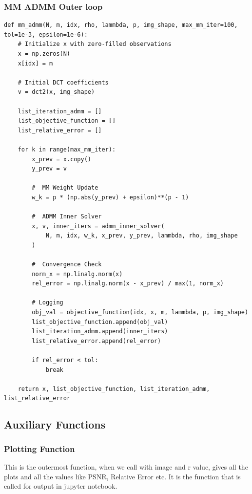 \documentclass[12pt,a4paper,onecolumn]{exam}
\begin{document}
\subsubsection{MM ADMM  Outer loop}
\begin{lstlisting}
def mm_admm(N, m, idx, rho, lammbda, p, img_shape, max_mm_iter=100, tol=1e-3, epsilon=1e-6):
    # Initialize x with zero-filled observations
    x = np.zeros(N)
    x[idx] = m
    
    # Initial DCT coefficients
    v = dct2(x, img_shape)
    
    list_iteration_admm = [] 
    list_objective_function = [] 
    list_relative_error = [] 
    
    for k in range(max_mm_iter):
        x_prev = x.copy()
        y_prev = v
        
        #  MM Weight Update 
        w_k = p * (np.abs(y_prev) + epsilon)**(p - 1)
            
        #  ADMM Inner Solver 
        x, v, inner_iters = admm_inner_solver(
            N, m, idx, w_k, x_prev, y_prev, lammbda, rho, img_shape
        )
        
        #  Convergence Check 
        norm_x = np.linalg.norm(x)
        rel_error = np.linalg.norm(x - x_prev) / max(1, norm_x)

        # Logging
        obj_val = objective_function(idx, x, m, lammbda, p, img_shape)
        list_objective_function.append(obj_val)
        list_iteration_admm.append(inner_iters)
        list_relative_error.append(rel_error)
        
        if rel_error < tol:
            break
            
    return x, list_objective_function, list_iteration_admm, list_relative_error
\end{lstlisting}

\subsection{Auxiliary Functions}

\subsubsection{Plotting Function}
This is the outermost function, when we call with image and r value, gives all the plots and all the values like PSNR, Relative Error etc. It is the function that is called for output in jupyter notebook.
\end{document}
